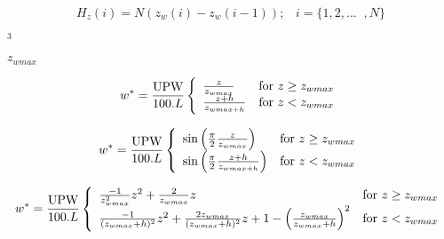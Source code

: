 {\newpage\clearpage
{}%
\begin{displaymath}
H_z(i) = N \left(z_{w}(i)-z_{w}(i-1)\right); 
\;\;\;
i=\{1,2,... \;\; ,N\}
\end{displaymath}%
\lthtmldisplayZ
\lthtmlcheckvsize\clearpage}

{\newpage\clearpage
{}%
$^3$%
\lthtmlinlinemathZ
\lthtmlcheckvsize\clearpage}

{\newpage\clearpage
{}%
$z_{wmax}$%
\lthtmlinlinemathZ
\lthtmlcheckvsize\clearpage}

{\newpage\clearpage
{}%
\begin{displaymath}
w^*=\frac{\hbox{UPW}}{100.L} \left\{ \begin{array}{ll}
                       \frac{z}{z_{wmax}} & \hbox{for } z\ge z_{wmax} \\
                       \frac{z + h}{z_{wmax + h}} & \hbox{for } z < z_{wmax}
                       \end{array}\right.            
\end{displaymath}%
\lthtmldisplayZ
\lthtmlcheckvsize\clearpage}

{\newpage\clearpage
{}%
\begin{displaymath}
w^*=\frac{\hbox{UPW}}{100.L} \left\{ \begin{array}{ll}
         \sin\left(\frac{\pi}{2} \frac{z}{z_{wmax}}\right) & \hbox{for } z\ge z_{wmax} \\
         \sin\left(\frac{\pi}{2} \frac{z + h}{z_{wmax + h}}\right) & \hbox{for } z < z_{wmax}
         \end{array}\right.            
\end{displaymath}%
\lthtmldisplayZ
\lthtmlcheckvsize\clearpage}

{\newpage\clearpage
{}%
\begin{displaymath}
w^*=\frac{\hbox{UPW}}{100.L} \left\{ \begin{array}{ll}
         \frac{-1}{z_{wmax}^2}z^2
         + \frac{2}{z_{wmax}}z 
         & \hbox{for } z\ge z_{wmax} \\
         \frac{-1}{(z_{wmax}+h)^2}z^2  
         + \frac{2z_{wmax}}{(z_{wmax}+h)^2}z
         + 1 - \left(\frac{z_{wmax}}{z_{wmax}+h}\right)^2
         & \hbox{for } z < z_{wmax}
         \end{array}\right.            
\end{displaymath}%
\lthtmldisplayZ
\lthtmlcheckvsize\clearpage}

